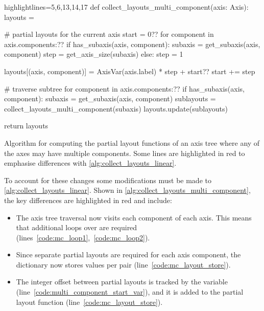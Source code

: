 \documentclass[thesis]{subfiles}
\begin{document}
\begin{algorithm}
  \begin{flushright}
    \begin{minipage}{.96\textwidth}
      \begin{pyalg2*}{highlightlines={5,6,13,14,17}}
        def collect_layouts_multi_component(axis: Axis):
          layouts = {}

          # partial layouts for the current axis
          start = 0?\label{code:multi_component_start_var}?
          for component in axis.components:?\label{code:mc_loop1}?
            if has_subaxis(axis, component):
              subaxis = get_subaxis(axis, component)
              step = get_axis_size(subaxis)
            else:
              step = 1

            layouts[(axis, component)] = AxisVar(axis.label) * step + start?\label{code:mc_layout_store}?
            start += step

          # traverse subtree
          for component in axis.components:?\label{code:mc_loop2}?
            if has_subaxis(axis, component): 
              subaxis = get_subaxis(axis, component)
              sublayouts = collect_layouts_multi_component(subaxis)
              layouts.update(sublayouts)

          return layouts
      \end{pyalg2*}
    \end{minipage}
  \end{flushright}

  \caption{
    Algorithm for computing the partial layout functions of an axis tree where any of the axes may have multiple components.
    Some lines are highlighted in red to emphasise differences with \cref{alg:collect_layouts_linear}.
  }
  \label{alg:collect_layouts_multi_component}
\end{algorithm}

To account for these changes some modifications must be made to \cref{alg:collect_layouts_linear}.
Shown in \cref{alg:collect_layouts_multi_component}, the key differences are highlighted in red and include:
\begin{itemize}
  \item
    The axis tree traversal now visits each component of each axis.
    This means that additional loops over  are required (lines~\ref{code:mc_loop1},~\ref{code:mc_loop2}).
  \item
    Since separate partial layouts are required for each axis component, the  dictionary now stores values per  pair (line~\ref{code:mc_layout_store}).
  \item
    The integer offset between partial layouts is tracked by the  variable (line~\ref{code:multi_component_start_var}), and it is added to the partial layout function (line~\ref{code:mc_layout_store}).
\end{itemize}
\end{document}

